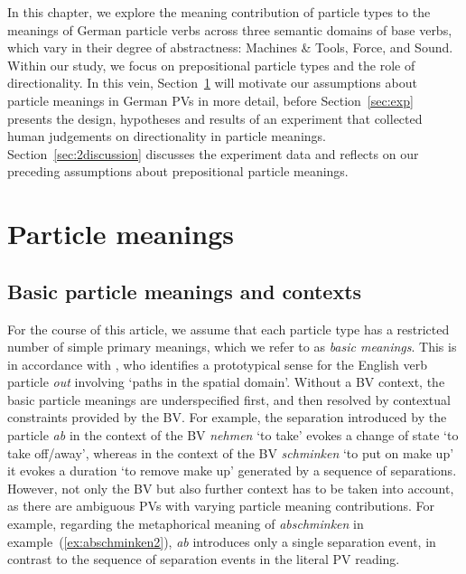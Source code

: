 \documentclass[output=paper]{langsci/langscibook}
\begin{document}
In this chapter, we explore the meaning contribution of particle types
to the meanings of German particle verbs across three semantic domains
of base verbs, which vary in their degree of abstractness:
Machines \& Tools, Force, and Sound. With\-in our study, we focus
on prepositional particle types and the role of directionality. In
this vein, Section~\ref{sec:p-meaning} will motivate our assumptions
about particle meanings in German PVs in more detail, before
Section~\ref{sec:exp} presents the design, hypotheses and results of
an experiment that collected human judgements on directionality in
particle meanings. Section~\ref{sec:2discussion} discusses the
experiment data and reflects on our preceding assumptions about
prepositional particle meanings.


\section{Particle meanings}
\label{sec:p-meaning}

\subsection{Basic particle meanings and contexts}

For the course of this article, we assume that each particle type has
a restricted number of simple primary meanings, which we refer to as
\textit{basic meanings}. This is in accordance with \cite{Lindner:83},
who identifies a prototypical sense for the English verb particle
\textit{out} involving `paths in the spatial domain'. Without a BV
context, the basic particle meanings are underspecified first, and
then resolved by contextual constraints provided by the BV. For
example, the separation introduced by the particle \textit{ab} in the
context of the BV \textit{nehmen} `to take' evokes a change of state
`to take off/away', whereas in the context of the BV
\textit{schminken} `to put on make up' it evokes a duration `to
remove make up' generated by a sequence of separations. However, not
only the BV but also further context has to be taken into account, as
there are ambiguous PVs with varying particle meaning
contributions. For example, regarding the metaphorical meaning of
\textit{abschminken} in example~(\ref{ex:abschminken2}), \textit{ab}
introduces only a single separation event, in contrast to the sequence
of separation events in the literal PV reading.
\end{document}
